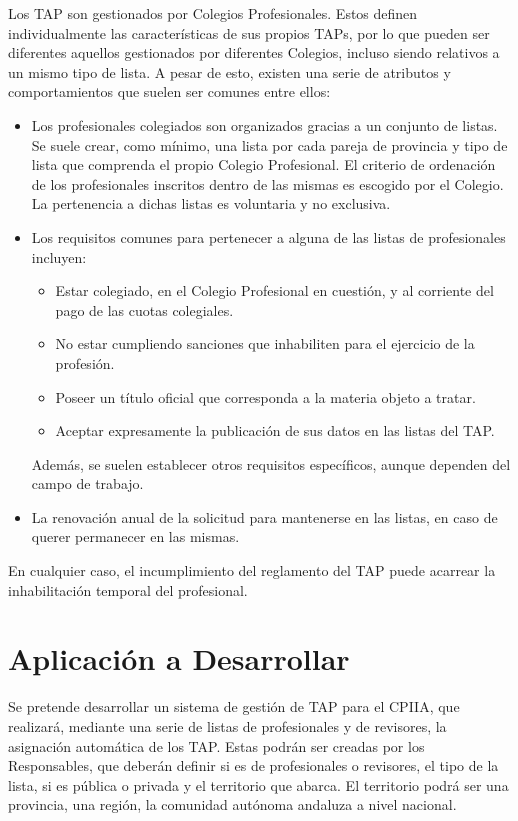 Los TAP son gestionados por Colegios Profesionales. Estos definen individualmente las características de sus propios TAPs, por lo que pueden ser diferentes aquellos gestionados por diferentes Colegios, incluso siendo relativos a un mismo tipo de lista. A pesar de esto, existen una serie de atributos y comportamientos que suelen ser comunes entre ellos\cite{colegiosinformaticaccii}:
\begin{itemize}
\item Los profesionales colegiados son organizados gracias a un conjunto de listas. Se suele crear, como mínimo, una lista por cada pareja de provincia y tipo de lista que comprenda el propio Colegio Profesional. El criterio de ordenación de los profesionales inscritos dentro de las mismas es escogido por el Colegio. La pertenencia a dichas listas es voluntaria y no exclusiva.
\item Los requisitos comunes para pertenecer a alguna de las listas de profesionales incluyen:
	\begin{itemize}
	\item Estar colegiado, en el Colegio Profesional en cuestión, y al corriente del pago de las cuotas colegiales.
	\item No estar cumpliendo sanciones que inhabiliten para el ejercicio de la profesión.
	\item Poseer un título oficial que corresponda a la materia objeto a tratar.
	\item Aceptar expresamente la publicación de sus datos en las listas del TAP.
	\end{itemize}
Además, se suelen establecer otros requisitos específicos, aunque dependen del campo de trabajo.
\item La renovación anual de la solicitud para mantenerse en las listas, en caso de querer permanecer en las mismas. 
\end{itemize}

En cualquier caso, el incumplimiento del reglamento del TAP puede acarrear la inhabilitación temporal del profesional.


\section{Aplicación a Desarrollar}
Se pretende desarrollar un sistema de gestión de TAP para el CPIIA\cite{reglamentotapcpiia}, que realizará, mediante una serie de listas de profesionales y de revisores, la asignación automática de los TAP. Estas podrán ser creadas por los Responsables, que deberán definir si es de profesionales o revisores, el tipo de la lista, si es pública o privada y el territorio que abarca. El territorio podrá ser una provincia, una región, la comunidad autónoma andaluza a nivel nacional.

